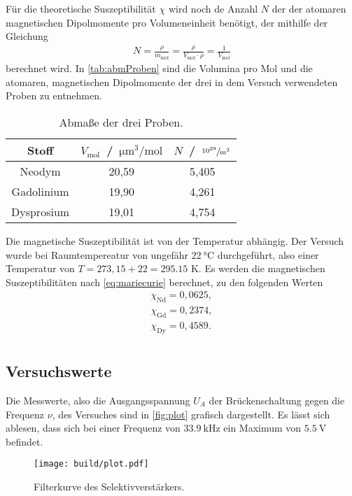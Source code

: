 \noindent
Für die theoretische Suszeptibilität $\chi$ wird noch de Anzahl $N$ der der atomaren magnetischen Dipolmomente pro Volumeneinheit benötigt, der mithilfe der Gleichung 
\begin{align*}
  N = \frac{\rho}{m_{\text{mol}}} = \frac{\rho}{V_{\text{mol}} \cdot \rho} = \frac{1}{V_{\text{mol}}} %
\end{align*}
berechnet wird.
In \autoref{tab:abmProben} sind die Volumina pro Mol und die atomaren, magnetischen Dipolmomente der drei in dem Versuch verwendeten Proben zu entnehmen.
\begin{table}[H]
  \centering
  \caption{Abmaße der drei Proben.}
  \label{tab:abmProben}
  \begin{tabular}{c|c c}
    \toprule
    Stoff & $V_{\text{mol}}$ \,/\, $\si{\micro\cubic\meter\per\mole}$ & $N$ \,/\, $\sfrac{10^{29}}{\si{\cubic\meter}}$ \\
    \midrule
    Neodym & 20,59 & 5,405 \\
    Gadolinium & 19,90 & 4,261 \\
    Dysprosium & 19,01 & 4,754 \\
    \bottomrule
  \end{tabular}
\end{table}

\noindent
Die magnetische Suszeptibilität ist von der Temperatur abhängig. Der Versuch wurde bei Raumtempereatur von ungefähr $\SI{22}{\degreeCelsius}$ durchgeführt, also einer Temperatur von $T = 273,15 + 22 = 295.15$ K.
Es werden die magnetischen Suszeptibilitäten nach \autoref{eq:mariecurie} berechnet, zu den folgenden Werten
\begin{align*}
  \chi_{\text{Nd}} = 0,0625,  \\
  \chi_{\text{Gd}} = 0,2374, \\
  \chi_{\text{Dy}} = 0,4589. \\
\end{align*}






\subsection{Versuchswerte}
\label{subsec:versuchsW}
Die Messwerte, also die Ausgangsspannung $U_A$ der Brückenschaltung gegen die Frequenz $\nu$, des Versuches sind in \autoref{fig:plot} grafisch dargestellt.
Es lässt sich ablesen, dass sich bei einer Frequenz von $\SI{33,9}{\kilo\hertz}$ ein Maximum von $\SI{5,5}{\volt}$ befindet. 
\begin{figure}[H]
  \centering
  \texttt{[image: build/plot.pdf]}
  \caption{Filterkurve des Selektivverstärkers.}
  \label{fig:plot}
\end{figure}

